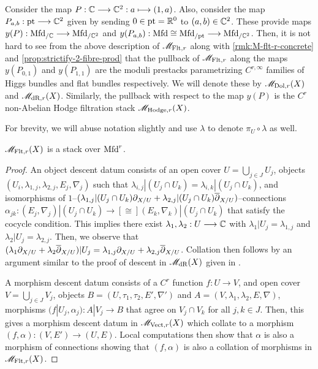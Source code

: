 \documentclass[11pt]{amsart}
\begin{document}
\begin{defn}\label{defn:M-Dol-dR-Hodge}
Consider the map $P : \bC \to \bC^2 : a \mapsto (1, a)$.
Also, consider the map $P_{a, b} : \pt \to \bC^2$ given by sending $0 \in \mathrm{pt} = \mathbb{R}^0$
to $(a, b) \in \mathbb{C}^2$. 
These provide maps
$y(P) : \Mfd_{/\bC} \to \Mfd_{/\bC^2}$ and
$y(P_{a, b}) : \Mfd \cong \Mfd_{/\pt} \to \Mfd_{/\bC^2}$.
Then, it is not hard to see from the above description of $\mathscr{M}_{\mathrm{Flt}, r}$ along with
\cref{rmk:M-flt-r-concrete} and
\cref{prop:strictify-2-fibre-prod} that
the pullback of $\mathscr{M}_{\mathrm{Flt}, r}$ along the maps $y(P_{0, 1})$ and $y(P_{1, 1})$
are the moduli prestacks parametrizing $C^{r, \infty}$ families of Higgs bundles and flat bundles
respectively. We will denote these by $\mathscr{M}_{\mathrm{Dol}, r}(X)$ and $\mathscr{M}_{\mathrm{dR}, r}(X)$.
Similarly, the pullback with respect to the map $y(P)$ is the $C^r$ non-Abelian Hodge filtration
stack $\mathscr{M}_{\mathrm{Hodge}, r}(X)$.
\end{defn}

\begin{notn}
For brevity, we will abuse notation slightly and use $\lambda$ to denote $\pi_U \circ \lambda$
as well.
\end{notn}

\begin{prop}\label{prop:M-flt-r-stack}
$\mathscr{M}_{\mathrm{Flt}, r}(X)$ is a stack over $\mathrm{Mfd}^r$.
\end{prop}
\begin{proof}
An object descent datum consists of an open cover $U = \bigcup_{j \in J} U_j$, objects
$(U_i, \lambda_{1, j}, \lambda_{2, j}, E_j, \nabla_j)$ such that
$\lambda_{i, j}|(U_j \cap U_k) = \lambda_{i, k}|(U_j \cap U_k)$, and isomorphisms of
$1$--$(\lambda_{1, j}|(U_j \cap U_k)\partial_{X/U}
+ \lambda_{2, j}|(U_j \cap U_k)\overline{\partial}_{X/U})$--connections
$\alpha_{jk} : (E_j, \nabla_j)|(U_j \cap U_k) \to[\cong] (E_k, \nabla_k)|(U_j \cap U_k)$
that satisfy the cocycle condition.
This implies there exist $\lambda_1, \lambda_2 : U \to \bC$ with $\lambda_1|U_j = \lambda_{1, j}$
and $\lambda_2|U_j = \lambda_{2, j}$.
Then, we observe that
$(\lambda_1 \partial_{X/U} + \lambda_2 \overline{\partial}_{X/U})|U_j = \lambda_{1, j}\partial_{X/U}
+ \lambda_{2, j}\overline{\partial}_{X/U}$.
Collation then follows by an argument similar to the proof of descent in $\mathscr{M}_{\mathrm{dR}}(X)$ given in
\cite[Theorem 3.4.1]{AR26a}.

A morphism descent datum consists of a $C^r$ function $f : U \to V$, and open cover
$V = \bigcup_{j \in J} V_j$, objects $B = (U, \tau_1, \tau_2, E', \nabla')$ and
$A = (V, \lambda_1, \lambda_2, E, \nabla)$, morphisms $(f|U_j, \alpha_j) : A|V_j \to B$
that agree on $V_j \cap V_k$ for all $j, k \in J$. Then, this gives a morphism descent datum
in $\mathscr{M}_{\mathrm{Vect}, r}(X)$ which collate to a morphism $(f, \alpha) : (V, E') \to (U, E)$.
Local computations then show that $\alpha$ is also a morphism of connections showing
that $(f, \alpha)$ is also a collation of morphisms in $\mathscr{M}_{\mathrm{Flt}, r}(X)$.
\end{proof}
\end{document}
